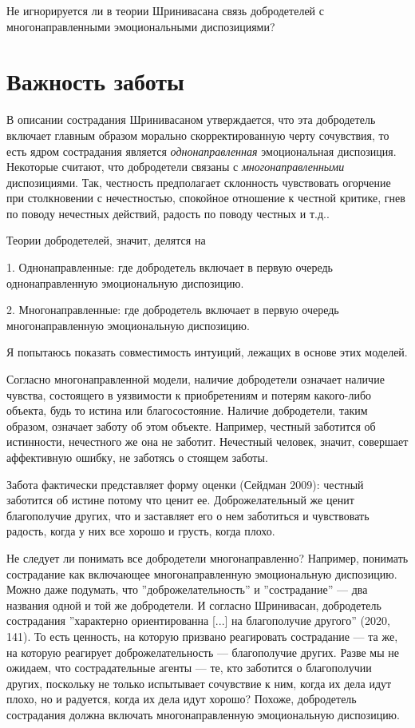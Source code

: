 \documentclass[11pt]{book}
\begin{document}
Не игнорируется ли в теории Шринивасана связь добродетелей с многонаправленными эмоциональными диспозициями?

\section{Важность заботы}

В описании сострадания Шринивасаном утверждается, что эта добродетель включает главным образом морально скорректированную черту сочувствия, то есть ядром сострадания является \textit{однонаправленная} эмоциональная диспозиция. Некоторые считают, что добродетели связаны с \textit{многонаправленными} диспозициями. Так, честность предполагает склонность чувствовать огорчение при столкновении с нечестностью, спокойное отношение к честной критике, гнев по поводу нечестных действий, радость по поводу честных и т.д..

Теории добродетелей, значит, делятся на

1. Однонаправленные: где добродетель включает в первую очередь однонаправленную эмоциональную диспозицию.

2. Многонаправленные: где добродетель включает в первую очередь многонаправленную эмоциональную диспозицию.

Я попытаюсь показать совместимость интуиций, лежащих в основе этих моделей.

Согласно многонаправленной модели, наличие добродетели означает наличие чувства, состоящего в уязвимости к приобретениям и потерям какого-либо объекта, будь то истина или благосостояние. Наличие добродетели, таким образом, означает заботу об этом объекте. Например, честный заботится об истинности, нечестного же она не заботит. Нечестный человек, значит, совершает аффективную ошибку, не заботясь о стоящем заботы.

Забота фактически представляет форму оценки (Сейдман 2009): честный заботится об истине потому что ценит ее. Доброжелательный же ценит благополучие других, что и заставляет его о нем заботиться и чувствовать радость, когда у них все хорошо и грусть, когда плохо.

Не следует ли понимать все добродетели многонаправленно? Например, понимать сострадание как включающее многонаправленную эмоциональную диспозицию. Можно даже подумать, что ''доброжелательность'' и ''сострадание'' --- два названия одной и той же добродетели. И согласно Шринивасан, добродетель сострадания ''характерно ориентированна [...] на благополучие другого'' (2020, 141). То есть ценность, на которую призвано реагировать сострадание --- та же, на которую реагирует доброжелательность --- благополучие других. Разве мы не ожидаем, что сострадательные агенты --- те, кто заботится о благополучии других, поскольку не только испытывает сочувствие к ним, когда их дела идут плохо, но и радуется, когда их дела идут хорошо? Похоже, добродетель сострадания должна включать многонаправленную эмоциональную диспозицию.
\end{document}
